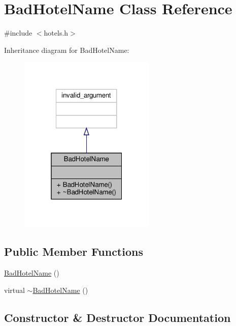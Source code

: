 \hypertarget{class_bad_hotel_name}{}\section{Bad\+Hotel\+Name Class Reference}
\label{class_bad_hotel_name}


{\ttfamily \#include $<$hotels.\+h$>$}



Inheritance diagram for Bad\+Hotel\+Name\+:\nopagebreak
\begin{figure}[H]
\begin{center}
\leavevmode
\includegraphics[width=184pt]{class_bad_hotel_name__inherit__graph}
\end{center}
\end{figure}
\subsection*{Public Member Functions}
\begin{DoxyCompactItemize}
\item 
\hyperlink{class_bad_hotel_name_a3e89385bf509245a838c1fcba3736a89}{Bad\+Hotel\+Name} ()
\item 
virtual \hyperlink{class_bad_hotel_name_aa2ad2390a5422aacbb9c61109957d58a}{$\sim$\+Bad\+Hotel\+Name} ()
\end{DoxyCompactItemize}


\subsection{Constructor \& Destructor Documentation}
\mbox{\label{class_bad_hotel_name_a3e89385bf509245a838c1fcba3736a89}} 
